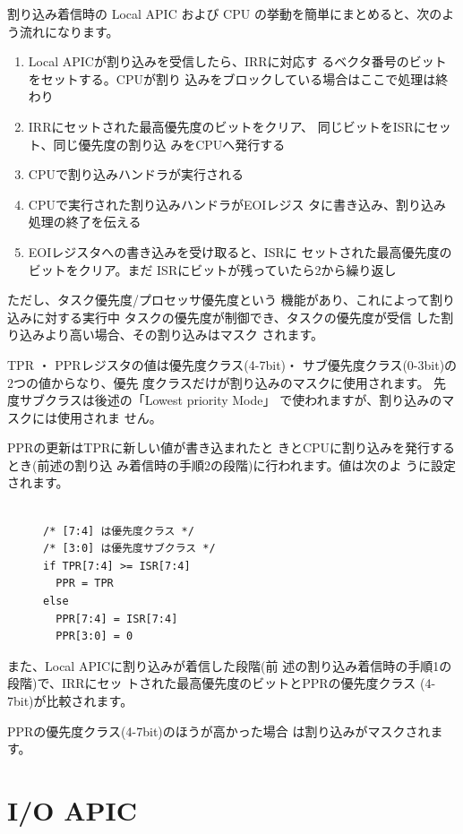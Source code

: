  割り込み着信時の Local APIC および CPU
の挙動を簡単にまとめると、次のよう流れになります。

\begin{enumerate}
\item Local APICが割り込みを受信したら、IRRに対応す
   るベクタ番号のビットをセットする。CPUが割り
   込みをブロックしている場合はここで処理は終わり
\item IRRにセットされた最高優先度のビットをクリア、
   同じビットをISRにセット、同じ優先度の割り込
   みをCPUへ発行する
\item CPUで割り込みハンドラが実行される
\item CPUで実行された割り込みハンドラがEOIレジス
   タに書き込み、割り込み処理の終了を伝える
\item EOIレジスタへの書き込みを受け取ると、ISRに
   セットされた最高優先度のビットをクリア。まだ
   ISRにビットが残っていたら2から繰り返し
\end{enumerate}

 ただし、タスク優先度/プロセッサ優先度という
機能があり、これによって割り込みに対する実行中
タスクの優先度が制御でき、タスクの優先度が受信
した割り込みより高い場合、その割り込みはマスク
されます。

 TPR ・ PPRレジスタの値は優先度クラス(4-7bit)・
サブ優先度クラス(0-3bit)の2つの値からなり、優先
度クラスだけが割り込みのマスクに使用されます。
先度サブクラスは後述の「Lowest priority Mode」
で使われますが、割り込みのマスクには使用されま
せん。

 PPRの更新はTPRに新しい値が書き込まれたと
きとCPUに割り込みを発行するとき(前述の割り込
み着信時の手順2の段階)に行われます。値は次のよ
うに設定されます。

\begin{figure}\centering
\begin{verbatim}

/* [7:4] は優先度クラス */
/* [3:0] は優先度サブクラス */
if TPR[7:4] >= ISR[7:4]
  PPR = TPR
else
  PPR[7:4] = ISR[7:4]
  PPR[3:0] = 0
\end{verbatim}
\end{figure}

 また、Local APICに割り込みが着信した段階(前
述の割り込み着信時の手順1の段階)で、IRRにセッ
トされた最高優先度のビットとPPRの優先度クラス
(4-7bit)が比較されます。

PPRの優先度クラス(4-7bit)のほうが高かった場合
は割り込みがマスクされます。


\section{I/O APIC}

